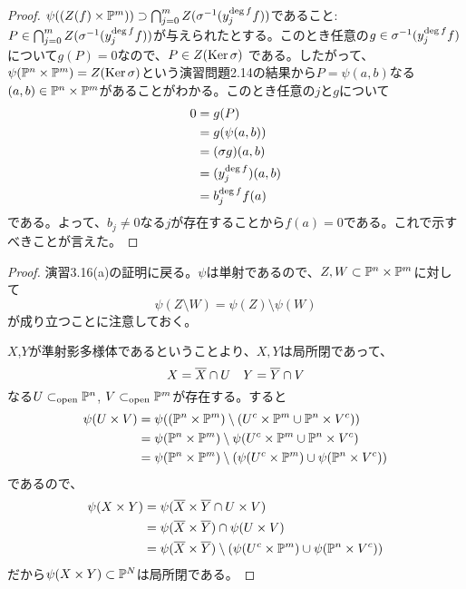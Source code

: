 \begin{proof}
  $\psi( (Z(f) \times {\mathbb P}^m) ) \supset  \bigcap_{j = 0}^m Z({\sigma}^{-1}(y_j^{\deg f}  f ) )$であること: $P \in \bigcap_{j = 0}^m Z({\sigma}^{-1}(y_j^{\deg f} f ) )$が与えられたとする。このとき任意の$g \in {\sigma}^{-1}(y_j^{\deg f} f )$について$g(P) = 0$なので、$P \in Z(\operatorname{Ker} {\sigma})$
  である。したがって、$\psi({\mathbb P}^n \times {\mathbb P}^m) = Z(\operatorname{Ker} {\sigma})$という演習問題2.14の結果から$P = \psi(a,b)$なる$(a,b) \in {\mathbb P}^n \times {\mathbb P}^m$があることがわかる。このとき任意の$j$と$g$について
  \begin{align*}
    0 &= g(P) \\
    &= g(\psi(a,b)) \\
    &= ({\sigma} g)(a,b) \\
    &= (y_j^{\deg f})(a,b) \\
    &= b_j^{\deg f}f(a)
  \end{align*}
  である。よって、$b_j \neq 0$なる$j$が存在することから$f(a) = 0$である。これで示すべきことが言えた。
\end{proof}

\begin{proof}
演習3.16(a)の証明に戻る。$\psi$は単射であるので、$Z,W \subset {\mathbb P}^n \times {\mathbb P}^m$に対して
\[
\psi(Z \setminus W) = \psi(Z) \setminus \psi(W)
\]
が成り立つことに注意しておく。

$X$,$Y$が準射影多様体であるということより、$X,Y$は局所閉であって、
\[
X = \overline{X} \cap U \quad Y = \overline{Y} \cap V
\]
なる$U \subset_{\text{open}} {\mathbb P}^n$, $V \subset_{\text{open}} {\mathbb P}^m$が存在する。すると
\begin{align*}
  \psi(U \times V) &= \psi(({\mathbb P}^n \times {\mathbb P}^m) \setminus (U^c \times {\mathbb P}^m \cup {\mathbb P}^n \times V^c)) \\
  &= \psi({\mathbb P}^n \times {\mathbb P}^m) \setminus \psi(U^c \times {\mathbb P}^m \cup {\mathbb P}^n \times V^c) \\
  &= \psi({\mathbb P}^n \times {\mathbb P}^m) \setminus (\psi(U^c \times {\mathbb P}^m ) \cup \psi({\mathbb P}^n \times V^c))
\end{align*}
であるので、
\begin{align*}
\psi(X \times Y ) &= \psi(\overline{X} \times \overline{Y} \cap U \times V)  \\
&= \psi(\overline{X} \times \overline{Y}) \cap \psi(U \times V)  \\
&= \psi(\overline{X} \times \overline{Y}) \setminus (\psi(U^c \times {\mathbb P}^m ) \cup \psi({\mathbb P}^n \times V^c))
\end{align*}
だから$\psi(X \times Y) \subset {\mathbb P}^N $は局所閉である。
\end{proof}
